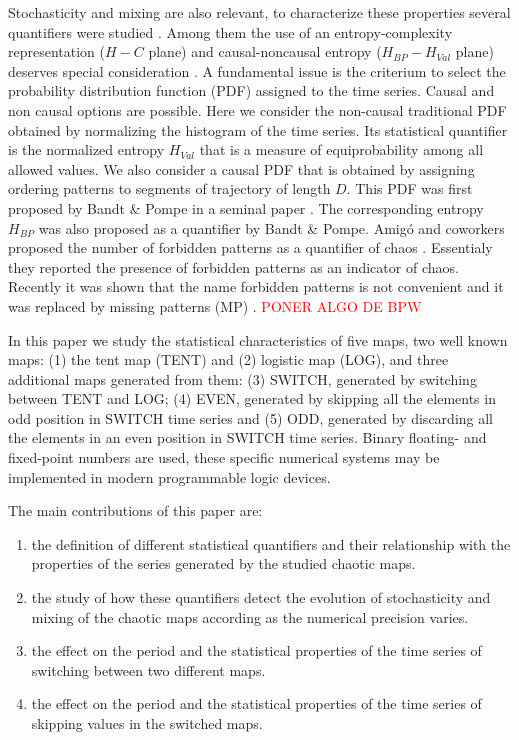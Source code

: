Stochasticity and mixing are also relevant, to characterize these properties several quantifiers were studied \cite{DeMicco2009}.
Among them the use of an entropy-complexity representation ($H-C$ plane) and causal-noncausal entropy ($H_{BP}-H_{Val}$ plane) deserves special consideration \cite{Rosso2007,DeMicco2008,DeMicco2012,DeMicco2009,Rosso2010,Antonelli2017}.
A fundamental issue is the criterium to select the probability distribution function (PDF) assigned to the time series.
Causal and non causal options are possible.
Here we consider the non-causal traditional PDF obtained by normalizing the histogram of the time series.
Its statistical quantifier is the normalized entropy $H_{Val}$ that is a measure of equiprobability among all allowed values.
We also consider a causal PDF that is obtained by assigning ordering patterns to segments of trajectory of length $D$.
This PDF was first proposed by Bandt \& Pompe in a seminal paper \cite{Bandt2002}.
The corresponding entropy $H_{BP}$ was also proposed as a quantifier by Bandt \& Pompe.
Amig\'o and coworkers proposed the number of forbidden patterns as a quantifier of chaos \cite{Amigo2007a}.
Essentialy they reported the presence of forbidden patterns as an indicator of chaos.
Recently it was shown that the name forbidden patterns is not convenient and it was replaced by missing patterns (MP) \cite{Rosso2012}.
\textcolor{red}{PONER ALGO DE BPW}



In this paper we study the statistical characteristics of five maps, two well known maps: (1) the tent map (TENT) and (2) logistic map (LOG), and three additional maps generated from them: (3) SWITCH, generated by switching between TENT and LOG; (4) EVEN, generated by skipping all the elements in odd position in SWITCH time series and (5) ODD, generated by discarding all the elements in an even position in SWITCH time series.
Binary floating- and fixed-point numbers are used, these specific numerical systems may be implemented in modern programmable logic devices.

The main contributions of this paper are:
\begin{enumerate}
\item the definition of different statistical quantifiers and their relationship with the properties of the series generated by the studied chaotic maps.
\item the study of how these quantifiers detect the evolution of stochasticity and mixing of the chaotic maps according as the numerical precision varies.
\item the effect on the period and the statistical properties of the time series of switching between two different maps.
\item the effect on the period and the statistical properties of the time series of skipping values in the switched maps.
\end{enumerate}

